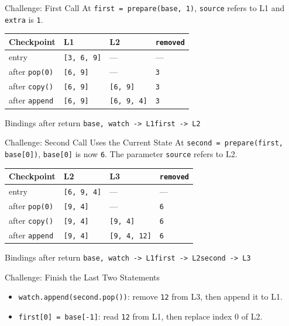 \documentclass[aspectratio=169,10pt]{beamer}
\begin{document}
\begin{frame}{Challenge: First Call}
  At \texttt{first = prepare(base, 1)}, \texttt{source} refers to L1 and \texttt{extra} is \texttt{1}.
  \begin{center}
    \renewcommand{\arraystretch}{1.4}
    \begin{tabular}{l|l|l|l}
      \textbf{Checkpoint} & \textbf{L1} & \textbf{L2} & \texttt{removed} \\\hline
      entry & \texttt{[3, 6, 9]} & --- & --- \\
      after \texttt{pop(0)} & \texttt{[6, 9]} & --- & \texttt{3} \\
      after \texttt{copy()} & \texttt{[6, 9]} & \texttt{[6, 9]} & \texttt{3} \\
      after \texttt{append} & \texttt{[6, 9]} & \texttt{[6, 9, 4]} & \texttt{3}
    \end{tabular}
  \end{center}
  \begin{block}{Bindings after return}
    \texttt{base, watch -> L1}\qquad \texttt{first -> L2}
  \end{block}
\end{frame}

\begin{frame}{Challenge: Second Call Uses the Current State}
  At \texttt{second = prepare(first, base[0])}, \texttt{base[0]} is now \texttt{6}. The parameter \texttt{source} refers to L2.
  \begin{center}
    \renewcommand{\arraystretch}{1.4}
    \begin{tabular}{l|l|l|l}
      \textbf{Checkpoint} & \textbf{L2} & \textbf{L3} & \texttt{removed} \\\hline
      entry & \texttt{[6, 9, 4]} & --- & --- \\
      after \texttt{pop(0)} & \texttt{[9, 4]} & --- & \texttt{6} \\
      after \texttt{copy()} & \texttt{[9, 4]} & \texttt{[9, 4]} & \texttt{6} \\
      after \texttt{append} & \texttt{[9, 4]} & \texttt{[9, 4, 12]} & \texttt{6}
    \end{tabular}
  \end{center}
  \begin{block}{Bindings after return}
    \texttt{base, watch -> L1}\qquad \texttt{first -> L2}\qquad \texttt{second -> L3}
  \end{block}
\end{frame}

\begin{frame}{Challenge: Finish the Last Two Statements}
  \begin{center}
    \resizebox{0.93\linewidth}{!}{\challengediagram}
  \end{center}
  \begin{itemize}
    \item \texttt{watch.append(second.pop())}: remove \texttt{12} from L3, then append it to L1.
    \item \texttt{first[0] = base[-1]}: read \texttt{12} from L1, then replace index 0 of L2.
  \end{itemize}
\end{frame}
\end{document}

